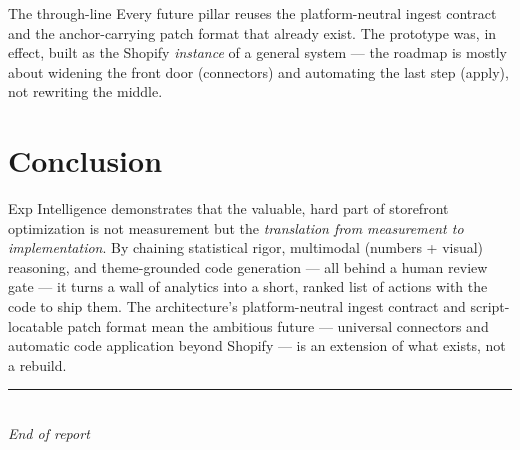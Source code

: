 \documentclass[11pt,a4paper]{article}
\begin{document}
\begin{keybox}{The through-line}
Every future pillar reuses the platform-neutral ingest contract and the
anchor-carrying patch format that already exist. The prototype was, in effect,
built as the Shopify \emph{instance} of a general system --- the roadmap is
mostly about widening the front door (connectors) and automating the last step
(apply), not rewriting the middle.
\end{keybox}

\section{Conclusion}

Exp Intelligence demonstrates that the valuable, hard part of storefront
optimization is not measurement but the \emph{translation from measurement to
implementation}. By chaining statistical rigor, multimodal (numbers + visual)
reasoning, and theme-grounded code generation --- all behind a human review
gate --- it turns a wall of analytics into a short, ranked list of actions with
the code to ship them. The architecture's platform-neutral ingest contract and
script-locatable patch format mean the ambitious future --- universal
connectors and automatic code application beyond Shopify --- is an extension of
what exists, not a rebuild.

\vfill
\begin{center}
{\color{rulegray}\rule{0.5\textwidth}{0.5pt}}\\[0.3cm]
{\small\itshape End of report}
\end{center}
\end{document}

